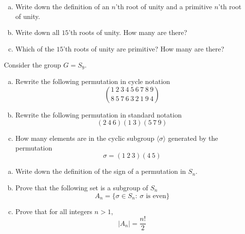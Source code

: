 \documentclass[11pt]{exam}
\theoremstyle{definition}
\begin{document}
\begin{questions}
\newpage
\question[10]\mbox{}
\begin{enumerate}[(a)]
\item Write down the definition of an $n$'th root of unity and a primitive $n$'th root of unity.
\vspace{2in}
\item Write down all $15$'th roots of unity.  How many are there?
\vspace{3in}
\item Which of the $15$'th roots of unity are primitive?  How many are there?
\end{enumerate}

\newpage
\question[10]\mbox{}
Consider the group $G=S_9$.
\begin{enumerate}[(a)]
\item Rewrite the following permutation in cycle notation
$$\binom{1\ 2\ 3\ 4\ 5\ 6\ 7\ 8\ 9}{8\ 5\ 7\ 6\ 3\ 2\ 1\ 9\ 4}$$
\vspace{2in}
\item Rewrite the following permutation in standard notation
$$(2\ 4\ 6)(1\ 3)(5\ 7\ 9)$$
\vspace{2in}
\item How many elements are in the cyclic subgroup $\langle \sigma\rangle$ generated by the permutation
$$\sigma = (1\ 2\ 3)(4\ 5)$$
\end{enumerate}

\newpage
\question[10]\mbox{}
\begin{enumerate}[(a)]
\item Write down the definition of the sign of a permutation in $S_n$.
\vspace{1in}
\item Prove that the following set is a subgroup of $S_n$
$$A_n = \{\sigma\in S_n:\ \text{$\sigma$ is even}\}$$
\vspace{3in}
\item Prove that for all integers $n > 1$,
$$|A_n| = \frac{n!}{2}$$
\end{enumerate}

\end{questions}
\end{document}
